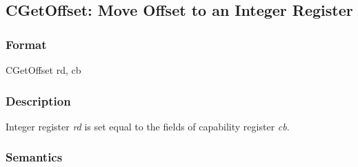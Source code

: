 \clearpage
{}
{}
\subsection*{CGetOffset: Move Offset to an Integer Register}

\subsubsection*{Format}

CGetOffset rd, cb

\begin{center}
\end{center}

\subsubsection*{Description}

Integer register \textit{rd} is set equal to the \coffset{} fields of
capability register \textit{cb}.

\subsubsection*{Semantics}


